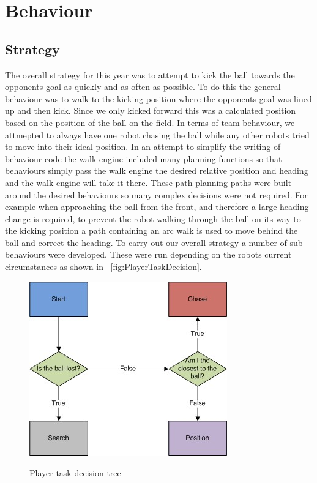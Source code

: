\section{Behaviour}
\label{Behaviour}
\subsection{Strategy}
The overall strategy for this year was to attempt to kick the ball towards the opponents goal as quickly and as often as possible. To do this the general behaviour was to walk to the kicking position where the opponents goal was lined up and then kick. Since we only kicked forward this was a calculated position based on the position of the ball on the field. In terms of team behaviour, we attmepted to always have one robot chasing the ball while any other robots tried to move into their ideal position. In an attempt to simplify the writing of behaviour code the walk engine included many planning functions so that behaviours simply pass the walk engine the desired relative position and heading and the walk engine will take it there. These path planning paths were built around the desired behaviours so many complex decisions were not required. For example when approaching the ball from the front, and therefore a large heading change is required, to prevent the robot walking through the ball on its way to the kicking position a path containing an arc walk is used to move behind the ball and correct the heading. To carry out our overall strategy a number of sub-behaviours were developed. These were run depending on the robots current circumstances as shown in ~\autoref{fig:PlayerTaskDecision}.

\begin{figure}[!h]
\begin{center}
   \leavevmode
    \scalebox{0.8} {\includegraphics{figs/FieldPlayerTaskDecision.jpg} }
    \caption{Player task decision tree}
    \label{fig:PlayerTaskDecision}
\end{center}
\end{figure}



